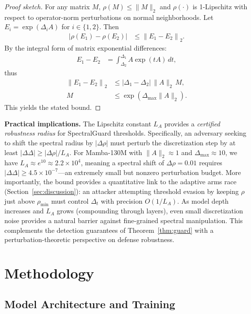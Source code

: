 \documentclass[10pt,twocolumn]{article}
\begin{document}
\begin{proof}[Proof sketch]
For any matrix $M$, $\rho(M)\le\|M\|_2$ and $\rho(\cdot)$ is 1-Lipschitz with respect to operator-norm perturbations on normal neighborhoods. Let $E_i=\exp(\Delta_iA)$ for $i\in\{1,2\}$. Then
\begin{align}
|\rho(E_1)-\rho(E_2)|
&\le
\left\| E_1-E_2 \right\|_2.
\end{align}
By the integral form of matrix exponential differences:
\begin{align}
E_1-E_2
&=
\int_{\Delta_2}^{\Delta_1} A\exp(tA)\,dt,
\end{align}
thus
\begin{align}
\left\| E_1-E_2 \right\|_2
&\le
|\Delta_1-\Delta_2|\, \|A\|_2
\, M, \\
M
&\le
\exp(\Delta_{\max}\|A\|_2).
\end{align}
This yields the stated bound.
\end{proof}

\textbf{Practical implications.} The Lipschitz constant $L_A$ provides a \emph{certified robustness radius} for SpectralGuard thresholds. Specifically, an adversary seeking to shift the spectral radius by $|\Delta\rho|$ must perturb the discretization step by at least $|\Delta\Delta| \ge |\Delta\rho| / L_A$. For Mamba-130M with $\|A\|_2 \approx 1$ and $\Delta_{\max} \approx 10$, we have $L_A \approx e^{10} \approx 2.2 \times 10^4$, meaning a spectral shift of $\Delta\rho = 0.01$ requires $|\Delta\Delta| \ge 4.5 \times 10^{-7}$---an extremely small but nonzero perturbation budget. More importantly, the bound provides a quantitative link to the adaptive arms race (Section~\ref{sec:discussion}): an attacker attempting threshold evasion by keeping $\rho$ just above $\rho_{\min}$ must control $\Delta_t$ with precision $O(1/L_A)$. As model depth increases and $L_A$ grows (compounding through layers), even small discretization noise provides a natural barrier against fine-grained spectral manipulation. This complements the detection guarantees of Theorem~\ref{thm:guard} with a perturbation-theoretic perspective on defense robustness.

\section{Methodology}
\label{sec:method}

\subsection{Model Architecture and Training}
\end{document}
